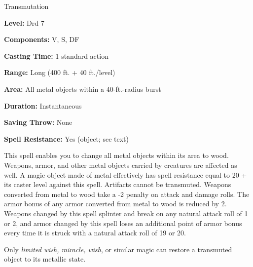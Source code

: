 
Transmutation

\textbf{Level:} Drd 7

\textbf{Components:} V, S, DF

\textbf{Casting Time:} 1 standard action

\textbf{Range:} Long (400 ft. + 40 ft./level)

\textbf{Area:} All metal objects within a 40-ft.-radius burst

\textbf{Duration:} Instantaneous

\textbf{Saving Throw:} None

\textbf{Spell Resistance:} Yes (object; see text)

This spell enables you to change all metal objects within its area to wood. Weapons, 
armor, and other metal objects carried by creatures are affected as well. A magic 
object made of metal effectively has spell resistance equal to 20 + its caster 
level against this spell. Artifacts cannot be transmuted. Weapons converted from 
metal to wood take a -2 penalty on attack and damage rolls. The armor bonus of 
any armor converted from metal to wood is reduced by 2. Weapons changed by this 
spell splinter and break on any natural attack roll of 1 or 2, and armor changed 
by this spell loses an additional point of armor bonus every time it is struck 
with a natural attack roll of 19 or 20.

Only \textit{limited wish, miracle, wish}, or similar magic can restore a transmuted 
object to its metallic state.

